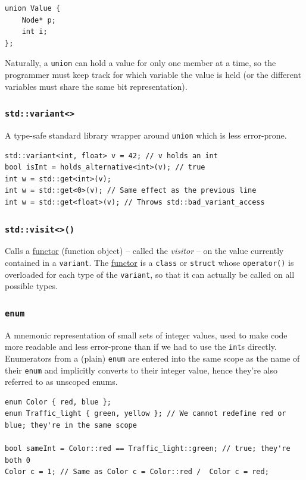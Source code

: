 \documentclass[table, xcdraw]{article}%
\begin{document}
\begin{verbatim}
union Value {
    Node* p;
    int i;
};
\end{verbatim}

Naturally, a \texttt{union} can hold a value for only one member at a time, so the programmer must keep track for which variable the value is held (or the different variables must share the same bit representation).

\subsubsection{\texttt{std::variant<>}}
A type-safe standard library wrapper around \texttt{union} which is less error-prone.

\begin{verbatim}
std::variant<int, float> v = 42; // v holds an int
bool isInt = holds_alternative<int>(v); // true
int w = std::get<int>(v);
int w = std::get<0>(v); // Same effect as the previous line
int w = std::get<float>(v); // Throws std::bad_variant_access
\end{verbatim}

\subsubsection{\texttt{std::visit<>()}}

Calls a \hyperref[functors]{functor} (function object) -- called the \emph{visitor} -- on the value currently contained in a \texttt{variant}. The \hyperref[functors]{functor} is a \texttt{class} or \texttt{struct} whose \texttt{operator()} is overloaded for each type of the \texttt{variant}, so that it can actually be called on all possible types.

\subsubsection{\texttt{enum}} \label{enum}
A mnemonic representation of small sets of integer values, used to make code more readable and less error-prone than if we had to use the \texttt{int}s directly. Enumerators from a (plain) \texttt{enum} are entered into the same scope as the name of their \texttt{enum} and implicitly converts to their integer value, hence they're also referred to as unscoped enums.

\begin{verbatim}
enum Color { red, blue };
enum Traffic_light { green, yellow }; // We cannot redefine red or blue; they're in the same scope

bool sameInt = Color::red == Traffic_light::green; // true; they're both 0
Color c = 1; // Same as Color c = Color::red /  Color c = red;
\end{verbatim}
\end{document}
